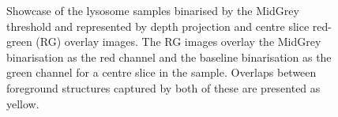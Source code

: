 \begin{figure}[h!]
	
	\caption[Showcase of the lysosome samples binarised by the Otsu threshold and represented by depth projection and red-green overlay images.]{Showcase of the lysosome samples binarised by the MidGrey threshold and represented by depth projection and centre slice red-green (RG) overlay images. The RG images overlay the MidGrey binarisation as the red channel and the baseline binarisation as the green channel for a centre slice in the sample. Overlaps between foreground structures captured by both of these are presented as yellow.}
	\label{fig:lyso_midgrey}
\end{figure}

\FloatBarrier

